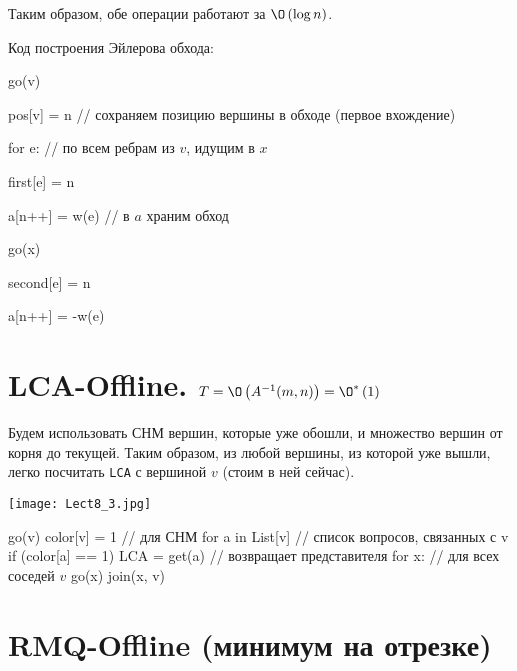 	Таким образом, обе операции работают за $\O\left(\log{n}\right)$. 

	Код построения Эйлерова обхода: 

\begin{cppcode}
          \item \hspace{0em} go(v)
          \item \hspace{2em}   pos[v] = n // сохраняем позицию вершины в обходе (первое вхождение)
          \item \hspace{2em}   for e: // по всем ребрам из $v$, идущим в $x$
          \item \hspace{4em}   first[e] = n
          \item \hspace{4em}   a[n++] = w(e) // в $a$ храним обход
          \item \hspace{4em}   go(x)
          \item \hspace{4em}   second[e] = n 
          \item \hspace{4em}   a[n++] = -w(e)
\end{cppcode}

  \section{LCA-Offline. $T = \O\left(A^{-1}(m, n)\right) = \O^*\left(1\right)$}
       Будем использовать СНМ вершин, которые уже обошли, и множество вершин от корня до текущей. Таким образом, из любой вершины, из которой уже вышли, легко посчитать \texttt{LCA} с вершиной $v$ (стоим в ней сейчас).


\texttt{[image: Lect8\_3.jpg]}

\begin{cppcode}
go(v)
	color[v] = 1 // для СНМ
	for a in List[v] // список вопросов, связанных с v
		if (color[a] == 1)
			LCA = get(a) // возвращает представителя
	for x: // для всех соседей $v$
		go(x)
		join(x, v)
\end{cppcode}

  \section{RMQ-Offline (минимум на отрезке)}

